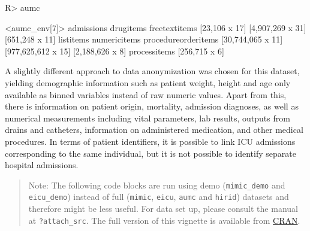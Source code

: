 \documentclass[
  notitle]{jss}
\begin{document}
\begin{CodeChunk}
\begin{CodeInput}
R> aumc
\end{CodeInput}
\begin{CodeOutput}
<aumc_env[7]>
         admissions           drugitems       freetextitems 
      [23,106 x 17]    [4,907,269 x 31]      [651,248 x 11] 
          listitems        numericitems procedureorderitems 
  [30,744,065 x 11]  [977,625,612 x 15]     [2,188,626 x 8] 
       processitems 
      [256,715 x 6] 
\end{CodeOutput}
\end{CodeChunk}

A slightly different approach to data anonymization was chosen for this
dataset, yielding demographic information such as patient weight, height
and age only available as binned variables instead of raw numeric
values. Apart from this, there is information on patient origin,
mortality, admission diagnoses, as well as numerical measurements
including vital parameters, lab results, outputs from drains and
catheters, information on administered medication, and other medical
procedures. In terms of patient identifiers, it is possible to link ICU
admissions corresponding to the same individual, but it is not possible
to identify separate hospital admissions.

\begin{quote}
Note: The following code blocks are run using demo (\texttt{mimic\_demo}
and \texttt{eicu\_demo}) instead of full (\texttt{mimic}, \texttt{eicu},
\texttt{aumc} and \texttt{hirid}) datasets and therefore might be less
useful. For data set up, please consult the manual at
\texttt{?attach\_src}. The full version of this vignette is available
from
\href{https://CRAN.R-project.org/package=ricu/vignettes/jss.pdf}{CRAN}.
\end{quote}
\end{document}
